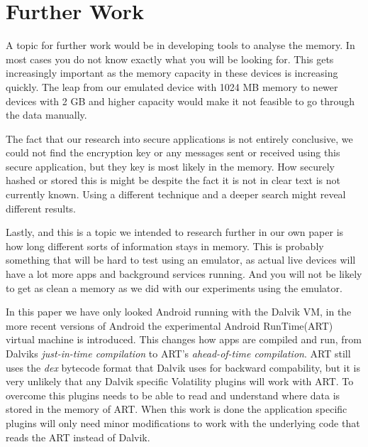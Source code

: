 \section{Further Work}
A topic for further work would be in developing tools
to analyse the memory. In most cases you do not know exactly what you will be looking for.
This gets increasingly important as the memory capacity
in these devices is increasing quickly. The leap from our
emulated device with 1024 MB memory to newer devices with
2 GB and higher capacity would make it not feasible to go
through the data manually.

The fact that our research into secure applications is not
entirely conclusive, we could not find the encryption key or any
messages sent or received using this secure application, but
they key is most likely in the memory. How securely hashed
or stored this is might be despite the fact it is not in clear text
is not currently known. Using a different technique and a deeper
search might reveal different results.

Lastly, and this is a topic we intended to research further
in our own paper is how long different sorts of information
stays in memory. This is probably something that will be hard
to test using an emulator, as actual live devices will have a lot
more apps and background services running. And you will not be
likely to get as clean a memory as we did with our experiments
using the emulator.

In this paper we have only looked Android running with
the Dalvik VM, in the more recent versions of
Android the experimental Android RunTime(ART) virtual
machine is introduced. This changes how apps are compiled
and run, from Dalviks \textit{just-in-time compilation} to
ART’s \textit{ahead-of-time compilation}. ART still uses the
\textit{dex} bytecode format that Dalvik uses for backward
compability, but it is very unlikely that any Dalvik specific
Volatility plugins will work with ART. To overcome this plugins
needs to be able to read and understand where data is stored in the memory of
ART. When this work is done the application specific plugins will only need
minor modifications to work with the underlying code that reads the ART instead
of Dalvik.

